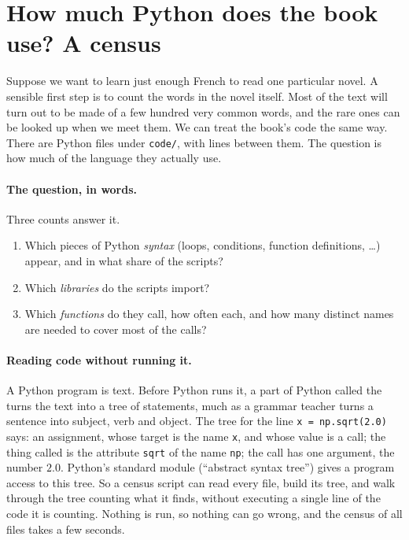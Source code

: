 \section{How much Python does the book use? A census}
\label{T0a:sec:census}

Suppose we want to learn just enough French to read one particular novel. A sensible first step is to count the words in the novel itself. Most of the text will turn out to be made of a few hundred very common words, and the rare ones can be looked up when we meet them. We can treat the book's code the same way. There are \TzFiles{} Python files under \texttt{code/}, with \TzLines{} lines between them. The question is how much of the language they actually use.

\paragraph{The question, in words.} Three counts answer it.
\begin{enumerate}[leftmargin=2em,itemsep=1pt]
  \item Which pieces of Python \emph{syntax} (loops, conditions, function definitions, \dots) appear, and in what share of the scripts?
  \item Which \emph{libraries} do the scripts import?
  \item Which \emph{functions} do they call, how often each, and how many distinct names are needed to cover most of the calls?
\end{enumerate}

\paragraph{Reading code without running it.} A Python program is text. Before Python runs it, a part of Python called the  turns the text into a tree of statements, much as a grammar teacher turns a sentence into subject, verb and object. The tree for the line \texttt{x = np.sqrt(2.0)} says: an assignment, whose target is the name \texttt{x}, and whose value is a call; the thing called is the attribute \texttt{sqrt} of the name \texttt{np}; the call has one argument, the number $2.0$. Python's standard module  (``abstract syntax tree'') gives a program access to this tree. So a census script can read every file, build its tree, and walk through the tree counting what it finds, without executing a single line of the code it is counting. Nothing is run, so nothing can go wrong, and the census of all \TzFiles{} files takes a few seconds.

